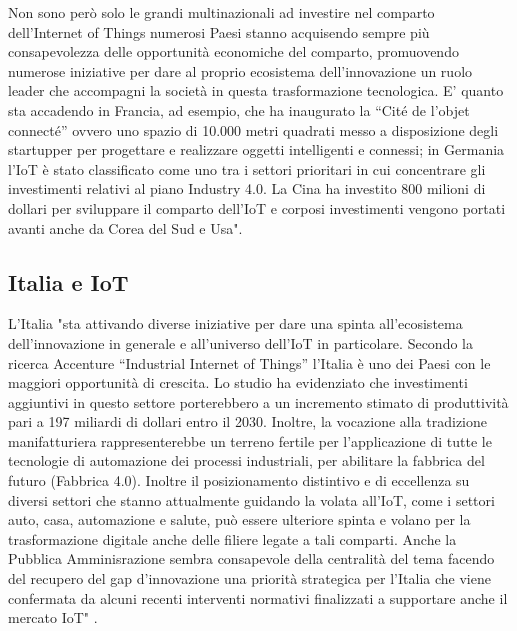 \documentclass[a4paper]{report} %
\begin{document}
Non sono però solo le grandi multinazionali ad investire nel comparto dell’Internet of Things numerosi Paesi stanno acquisendo sempre più consapevolezza delle opportunità economiche del comparto, promuovendo numerose iniziative per dare al proprio ecosistema dell’innovazione un ruolo leader che accompagni la società in questa trasformazione tecnologica. E’ quanto sta accadendo in Francia, ad esempio, che ha inaugurato la “Cité de l’objet connecté” ovvero uno spazio di 10.000 metri quadrati messo a disposizione degli startupper per progettare e realizzare oggetti intelligenti e connessi; in Germania l’IoT è stato  classificato come uno tra i settori prioritari in cui concentrare gli investimenti relativi al piano Industry 4.0. La Cina ha investito 800 milioni di dollari per sviluppare il comparto dell’IoT e corposi investimenti vengono portati avanti anche da Corea del Sud e Usa"\cite{art:rif.22}. 
\subsection{Italia e IoT} 
L'Italia "sta attivando diverse iniziative per dare una spinta all’ecosistema dell’innovazione in generale e all’universo dell’IoT in particolare. Secondo la ricerca Accenture “Industrial Internet of Things” l’Italia è uno dei Paesi con le maggiori opportunità di crescita. Lo studio ha evidenziato che investimenti aggiuntivi in questo settore porterebbero a un incremento stimato di produttività  pari a 197 miliardi di dollari entro il 2030.
Inoltre, la vocazione alla tradizione manifatturiera rappresenterebbe un terreno fertile per l’applicazione di tutte le tecnologie di automazione dei processi industriali, per abilitare la fabbrica del futuro (Fabbrica 4.0). Inoltre il posizionamento distintivo e di eccellenza su diversi settori che stanno attualmente guidando la volata all’IoT, come i settori auto, casa, automazione e salute, può essere ulteriore spinta e volano per la trasformazione digitale anche delle filiere legate a tali comparti.
Anche la Pubblica Amminisrazione sembra consapevole della centralità del tema facendo del recupero del gap d’innovazione una priorità strategica per l’Italia che viene confermata da alcuni recenti interventi normativi finalizzati a supportare anche il mercato IoT" \cite{art:rif.22}.
\end{document}
